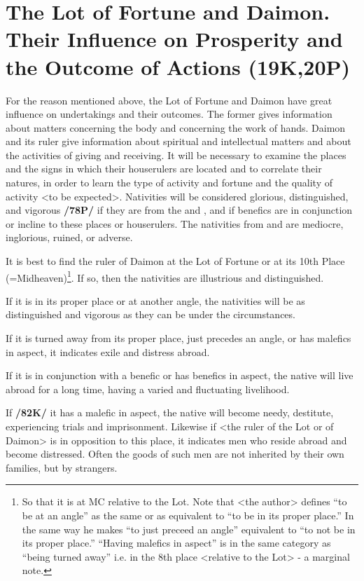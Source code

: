 \section{The Lot of Fortune and Daimon. Their Influence on Prosperity and the Outcome of Actions (19K,20P)}
 
For the reason mentioned above, the Lot of Fortune and Daimon have great influence on undertakings and their outcomes. The former gives information about matters concerning the body and concerning the work of hands. Daimon and its ruler give information about spiritual and intellectual matters and about the activities of giving and receiving. It will be necessary to examine the places and the signs in which their houserulers are located and to correlate their natures, in order to learn the type of activity and fortune and the quality of activity <to be expected>. Nativities will be considered glorious, distinguished, and vigorous \textbf{/78P/} if they are from the \Sun\xspace and \Moon, and if benefics are in conjunction or incline to these places or houserulers. The nativities from \Saturn\xspace and \Mars\xspace are mediocre, inglorious, ruined, or adverse. 

It is best to find the ruler of Daimon at the Lot of Fortune or at its 10th Place (=Midheaven)\footnote{So that it is at MC relative to the Lot. Note that <the author> defines “to be at an angle” as the same or as equivalent to “to be in its proper place.” In the same way he makes “to just preceed an angle” equivalent to “to not be in its proper place.” “Having malefics in aspect” is in the same category as “being turned away” i.e. in the 8th place <relative to the Lot> - a marginal note.}. If so, then the nativities are illustrious and
distinguished. 

If it is in its proper place or at another angle, the nativities will be as distinguished and vigorous as they can be under the circumstances. 

If it is turned away from its proper place, just precedes an angle, or has malefics in aspect, it indicates exile and distress abroad. 

If it is in conjunction with a benefic or has benefics in aspect, the native will live abroad for a long time, having a varied and fluctuating livelihood. 

If \textbf{/82K/} it has a malefic in aspect, the native will become needy, destitute, experiencing trials and imprisonment. Likewise if <the ruler of the Lot or of Daimon> is in opposition to this place, it indicates men who reside abroad and become distressed. Often the goods of such men are not inherited by their own families, but by strangers.

\newpage